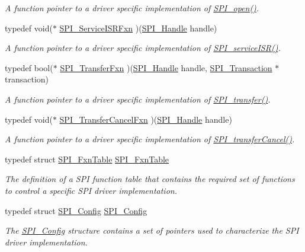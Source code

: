 \begin{DoxyCompactItemize}
\begin{DoxyCompactList}\small\item\em A function pointer to a driver specific implementation of \hyperlink{_s_p_i_8h_a62cfe494cb1df47cd602e8747e894fd1}{S\-P\-I\-\_\-open()}. \end{DoxyCompactList}\item 
typedef void($\ast$ \hyperlink{_s_p_i_8h_a382ab11d58280f1c1de4d0dbc632e3c3}{S\-P\-I\-\_\-\-Service\-I\-S\-R\-Fxn} )(\hyperlink{_s_p_i_8h_a728806534c3c3e8675cfbfb7d8e36f13}{S\-P\-I\-\_\-\-Handle} handle)
\begin{DoxyCompactList}\small\item\em A function pointer to a driver specific implementation of \hyperlink{_s_p_i_8h_aa6f1baa732ebbf0aa7cd5c3f7dfd215a}{S\-P\-I\-\_\-service\-I\-S\-R()}. \end{DoxyCompactList}\item 
typedef bool($\ast$ \hyperlink{_s_p_i_8h_a0c46374ffaa3d81ded9c8da17e16b861}{S\-P\-I\-\_\-\-Transfer\-Fxn} )(\hyperlink{_s_p_i_8h_a728806534c3c3e8675cfbfb7d8e36f13}{S\-P\-I\-\_\-\-Handle} handle, \hyperlink{struct_s_p_i___transaction}{S\-P\-I\-\_\-\-Transaction} $\ast$transaction)
\begin{DoxyCompactList}\small\item\em A function pointer to a driver specific implementation of \hyperlink{_s_p_i_8h_a989e17f96b54fcc3dc2cac5f8ac6bdb2}{S\-P\-I\-\_\-transfer()}. \end{DoxyCompactList}\item 
typedef void($\ast$ \hyperlink{_s_p_i_8h_a7e33c3913abdf78efc0ca606850a421b}{S\-P\-I\-\_\-\-Transfer\-Cancel\-Fxn} )(\hyperlink{_s_p_i_8h_a728806534c3c3e8675cfbfb7d8e36f13}{S\-P\-I\-\_\-\-Handle} handle)
\begin{DoxyCompactList}\small\item\em A function pointer to a driver specific implementation of \hyperlink{_s_p_i_8h_a6819f7761fc3505c4f885653ff8121f0}{S\-P\-I\-\_\-transfer\-Cancel()}. \end{DoxyCompactList}\item 
typedef struct \hyperlink{struct_s_p_i___fxn_table}{S\-P\-I\-\_\-\-Fxn\-Table} \hyperlink{_s_p_i_8h_abfe91bed666eb36f3b3fa54f4b9f84bf}{S\-P\-I\-\_\-\-Fxn\-Table}
\begin{DoxyCompactList}\small\item\em The definition of a S\-P\-I function table that contains the required set of functions to control a specific S\-P\-I driver implementation. \end{DoxyCompactList}\item 
typedef struct \hyperlink{struct_s_p_i___config}{S\-P\-I\-\_\-\-Config} \hyperlink{_s_p_i_8h_ae19802ec6efc91414e46af9b2435b942}{S\-P\-I\-\_\-\-Config}
\begin{DoxyCompactList}\small\item\em The \hyperlink{struct_s_p_i___config}{S\-P\-I\-\_\-\-Config} structure contains a set of pointers used to characterize the S\-P\-I driver implementation. \end{DoxyCompactList}\end{DoxyCompactItemize}
